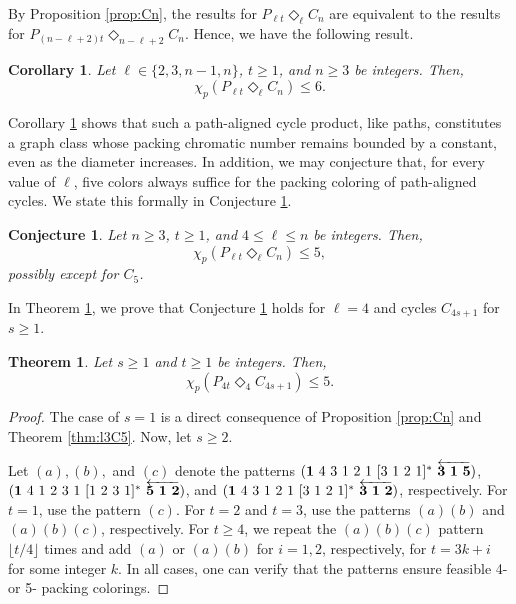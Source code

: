 \documentclass{article}
\newtheorem{conj}{Conjecture}
\newtheorem{theorem}{Theorem}
\newtheorem{corollary}{Corollary}
\begin{document}
By Proposition \ref{prop:Cn}, the results for $P_{\ell t} \Diamond_{\ell} C_n$ are equivalent to the results for $P_{(n-\ell+2)t} \Diamond_{n-\ell+2} C_n$. Hence, we have the following result.

\begin{corollary}\label{ref:SummaryCorollary} Let $\ell\in\{2,3, n-1,n\}$,  $t\geq 1$, and $n\geq 3$ be integers. Then,
    $$\chi_p(P_{\ell t} \Diamond_{\ell} C_n) \leq 6.$$
\end{corollary} 

Corollary \ref{ref:SummaryCorollary} shows that such a path-aligned cycle product, like paths, constitutes a graph class whose packing chromatic number remains bounded by a constant, even as the diameter increases. In addition, we may conjecture that, for every value of $\ell$, five colors always suffice for the packing coloring of path-aligned cycles. We state this formally in Conjecture \ref{conj:pathaligned}.

\begin{conj} \label{conj:pathaligned} Let $n\geq 3$, $t\geq 1$, and $4 \leq \ell \leq n$ be integers. Then,
    $$\chi_p(P_{\ell t} \Diamond_{\ell} C_{n}) \leq 5,$$
possibly except for $C_5$.
\end{conj}

In Theorem \ref{thm:partialconj}, we prove that Conjecture \ref{conj:pathaligned} holds for $\ell = 4$ and cycles $C_{4s+1}$ for $s\geq 1$.


\begin{theorem} \label{thm:partialconj}
    Let $s \geq 1$ and $t \geq 1$ be integers. Then,
    $$\chi_p(P_{4t} \Diamond_4 C_{4s+1})\leq 5.$$
    \label{thm:l4}
\end{theorem}
\begin{proof}
The case of $s=1$ is a direct consequence of Proposition \ref{prop:Cn} and Theorem \ref{thm:l3C5}. Now, let $s\geq 2$.

    Let $(a), (b),$ and $(c)$ denote the patterns $({\bf 1}\ 4\ 3\ 1\ 2 \ 1\ [3\ 1\ 2 \ 1]^*\ \overleftarrow{{\bf 3\ 1\ 5}})$, $({\bf 1}\ 4\ 1\ 2 \ 3 \ 1 \ [1\ 2 \ 3\ 1]^*\ \overleftarrow{{\bf 5\ 1\ 2}})$, and $({\bf 1}\ 4\ 3\ 1\ 2 \ 1\ [3\ 1\ 2 \ 1]^*\ \overleftarrow{{\bf 3\ 1\ 2}})$, respectively. For $t=1$, use the pattern $(c)$. For $t=2$ and $t=3$, use the patterns $(a)(b)$ and $(a)(b)(c)$, respectively. For $t \geq 4$, we repeat the $(a)(b)(c)$ pattern $\lfloor t/4 \rfloor$ times and add $(a)$ or $(a)(b)$ for $i=1,2$, respectively, for $t=3k+i$ for some integer $k$. In all cases, one can verify that the patterns ensure feasible 4-or 5- packing colorings.
\end{proof}
\end{document}
